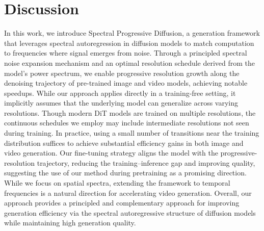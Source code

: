 \section{Discussion}\vspace{-5pt}
\label{sec:conclusion}
In this work, we introduce Spectral Progressive Diffusion, a generation framework that leverages spectral autoregression in diffusion models to match computation to frequencies where signal emerges from noise. 
Through a principled spectral noise expansion mechanism and an optimal resolution schedule derived from the model’s power spectrum, we enable progressive resolution growth along the denoising trajectory of pre-trained image and video models, achieving notable speedups. While our approach applies directly in a training-free setting, it implicitly assumes that the underlying model can generalize across varying resolutions. Though modern DiT models are trained on multiple resolutions, the continuous schedules we employ may include intermediate resolutions not seen during training. In practice, using a small number of transitions near the training distribution suffices to achieve substantial efficiency gains in both image and video generation. Our fine-tuning strategy aligns the model with the progressive-resolution trajectory, reducing the training--inference gap and improving quality, suggesting the use of our method during pretraining as a promising direction. While we focus on spatial spectra, extending the framework to temporal frequencies is a natural direction for accelerating video generation. Overall, our approach provides a principled and complementary approach for improving generation efficiency via the spectral autoregressive structure of diffusion models while maintaining high generation quality.




\iffalse
